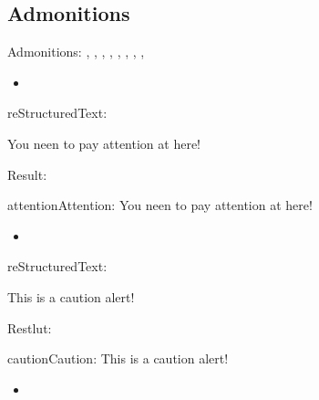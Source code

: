 \documentclass[letterpaper,12pt,english]{sphinxmanual}
\begin{document}
\subsection{Admonitions}
\label{\detokenize{rtxt:admonitions}}
Admonitions: , , , , , , , , 
\begin{itemize}
\item {} 

\end{itemize}

reStructuredText:

\begin{sphinxVerbatim}[commandchars=\\\{\}]
 

   You neen to pay attention at here!
\end{sphinxVerbatim}

Result:

\begin{sphinxadmonition}{attention}{Attention:}
You neen to pay attention at here!
\end{sphinxadmonition}
\begin{itemize}
\item {} 

\end{itemize}

reStructuredText:

\begin{sphinxVerbatim}[commandchars=\\\{\}]
 

   This is a caution alert!
\end{sphinxVerbatim}

Restlut:

\begin{sphinxadmonition}{caution}{Caution:}
This is a caution alert!
\end{sphinxadmonition}
\begin{itemize}
\item {} 

\end{itemize}
\end{document}
